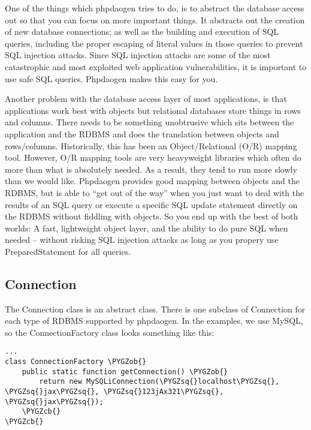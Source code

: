 \documentclass[letterpaper,10pt,english]{sphinxmanual}
\def\PYGZob{\char`\{}
\def\PYGZcb{\char`\}}
\def\PYGZsq{\char`\'}
\renewcommand\PYGZsq{\textquotesingle}
\begin{document}
One of the things which phpdaogen tries to do, is to abstract the database access out so that you
can focus on more important things.  It abstracts out the creation of new database connections; as
well as the building and execution of SQL queries, including the proper escaping of literal values
in those queries to prevent SQL injection attacks.  Since SQL injection attacks are some of the most
catastrophic and most exploited web application vulnerabilities, it is important to use safe SQL
queries.  Phpdaogen makes this easy for you.

Another problem with the database access layer of most applications, is that applications work best
with objects but relational databases store things in rows and columns.  There needs to be something
unobtrusive which sits between the application and the RDBMS and does the translation between
objects and rows/columns.  Historically, this has been an Object/Relational (O/R) mapping tool.
However, O/R mapping tools are very heavyweight libraries which often do more than what is
absolutely needed.  As a result, they tend to run more slowly than we would like.  Phpdaogen
provides good mapping between objects and the RDBMS, but is able to ``get out of the way'' when you
just want to deal with the results of an SQL query or execute a specific SQL update statement
directly on the RDBMS without fiddling with objects.  So you end up with the best of both worlds: A
fast, lightweight object layer, and the ability to do pure SQL when needed -- without risking SQL
injection attacks as long as you propery use PreparedStatement for all queries.


\subsection{Connection}
\label{jaxFrameworkGuide:connection}
The Connection class is an abstract class.  There is one subclass of Connection for each type of
RDBMS supported by phpdaogen.  In the examples, we use MySQL, so the ConnectionFactory class looks
something like this:

\begin{Verbatim}[commandchars=\\\{\}]
...
class ConnectionFactory \PYGZob{}
    public static function getConnection() \PYGZob{}
        return new MySQLiConnection(\PYGZsq{}localhost\PYGZsq{}, \PYGZsq{}jax\PYGZsq{}, \PYGZsq{}123jAx321\PYGZsq{}, \PYGZsq{}jax\PYGZsq{});
    \PYGZcb{}
\PYGZcb{}
\end{Verbatim}
\end{document}
